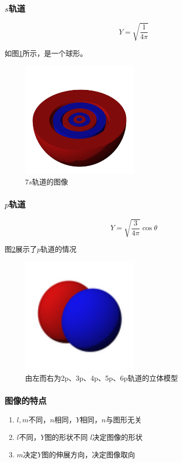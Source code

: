 \subsubsection{$s$轨道}

\begin{equation*}
    Y = \sqrt{\frac{1}{4\pi}}
\end{equation*}

如图\ref{fig:s_orbital}所示，是一个球形。

\begin{figure}[h]
    \centering
    \includegraphics[width=0.5\textwidth]{images/400px-S7M0.png}
    \caption{$7s$轨道的图像}
    \label{fig:s_orbital}
\end{figure}

\subsubsection{$p$轨道}

\begin{equation*}
    Y = \sqrt{\frac{3}{4\pi}} \cos \theta
\end{equation*}

图\ref{fig:p_orbital}展示了$p$轨道的情况

\begin{figure}[h]
    \centering
    \includegraphics[width=0.5\textwidth]{images/P2y.png}
    \caption{由左而右为2p、3p、4p、5p、6p轨道的立体模型}
    \label{fig:p_orbital}
\end{figure}



\subsubsection{图像的特点}

\begin{enumerate}
    \item $l,m$不同，$n$相同，$Y$相同，$n$与图形无关
    \item $l$不同，$Y$图的形状不同 $l$决定图像的形状
    \item $m$决定$Y$图的伸展方向，决定图像取向
\end{enumerate}
